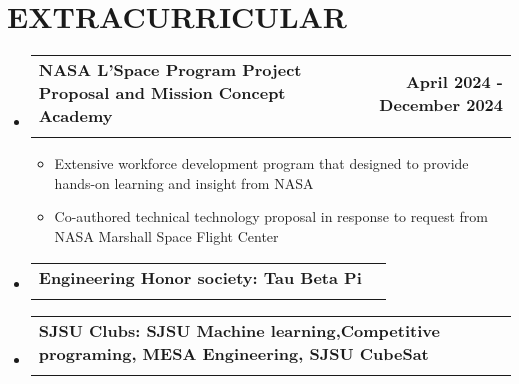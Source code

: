 \documentclass[letterpaper,11pt]{article}
\makeatletter
\newcommand{\resumeItem}[1]{
  \item\small{
    {#1 \vspace{-2pt}}
  }
}
\newcommand{\resumeSubheading}[4]{
  \vspace{-2pt}\item
    \begin{tabular*}{1.0\textwidth}[t]{l@{\extracolsep{\fill}}r}
      \textbf{#1} & \textbf{\small #2} \\
      {\small#3} & {\small #4} \\
    \end{tabular*}\vspace{-7pt}
}
\newcommand{\resumeSubHeadingListStart}{\begin{itemize}[leftmargin=0.0in, label={}]}
\newcommand{\resumeSubHeadingListEnd}{\end{itemize}}
\newcommand{\resumeItemListStart}{\begin{itemize}}
\newcommand{\resumeItemListEnd}{\end{itemize}\vspace{-5pt}}
\makeatother
\begin{document}
\section{EXTRACURRICULAR}
    \resumeSubHeadingListStart
      \resumeSubheading{NASA L'Space Program Project Proposal and Mission Concept Academy }{April 2024 - December 2024}{}{}\vspace{-16pt}
      \resumeItemListStart
      \resumeItem{Extensive workforce development program that designed to provide hands-on learning and insight from NASA }
        \resumeItem{Co-authored technical technology proposal in response to request from NASA Marshall Space Flight Center}
        \resumeItemListEnd
      \resumeSubheading{Engineering Honor society: Tau Beta Pi}{}{}{}\vspace{-16pt}
        \resumeSubheading{SJSU Clubs: SJSU Machine learning,Competitive programing, MESA Engineering, SJSU CubeSat}{}{}{}
        \resumeSubHeadingListEnd

\end{document}
